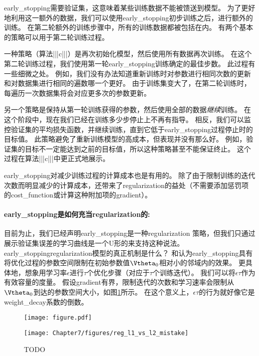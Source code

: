 \gls{early_stopping}需要验证集，这意味着某些训练数据不能被馈送到模型。
为了更好地利用这一额外的数据，我们可以使用\gls{early_stopping}初步训练之后，进行额外的训练。
在第二轮额外的训练步骤中，所有的训练数据都被包括在内。
有两个基本的策略可以用于第二轮训练过程。


一种策略（算法|||c|||）是再次初始化模型，然后使用所有数据再次训练。
在这个第二轮训练过程，我们使用第一轮\gls{early_stopping}训练确定的最佳步数。
此过程有一些细微之处。
例如，我们没有办法知道重新训练时对参数进行相同次数的更新和对数据集进行相同的遍数哪一个更好。
由于训练集变大了，在第二轮训练时，每遍历一次数据集将会对应更多次的参数更新。

另一个策略是保持从第一轮训练获得的参数，然后使用全部的数据\emph{继续}训练。
在这个阶段中，现在我们已经在训练多少步停止上不再有指导。
相反，我们可以监控验证集的平均损失函数，并继续训练，直到它低于\gls{early_stopping}过程停止时的目标值。
此策略避免了重新训练模型的高成本，但表现并没有那么好。
例如，验证集的目标不一定能达到之前的目标值，所以这种策略甚至不能保证终止。
这个过程在算法|||c|||中更正式地展示。

\gls{early_stopping}对减少训练过程的计算成本也是有用的。
除了由于限制训练的迭代次数而明显减少的计算成本，还带来了\gls{regularization}的益处（不需要添加惩罚项的\gls{cost_function}或计算这种附加项的\gls{gradient}）。


\paragraph{\gls{early_stopping}是如何充当\gls{regularization}的:}
目前为止，我们已经声明\gls{early_stopping}是一种\gls{regularization} 策略，但我们只通过展示验证集误差的学习曲线是一个U形的来支持这种说法。
\gls{early_stopping}\gls{regularization}模型的真正机制是什么？ 
\cite{Bishop1995}和\cite{Sjoberg95}认为\gls{early_stopping}具有将优化过程的参数空间限制在初始参数值$\Vtheta_0$相对小的邻域内的效果。
更具体地，想象用学习率$\epsilon$进行$\tau$个优化步骤（对应于$\tau$个训练迭代）。
我们可以将$\epsilon \tau$作为有效容量的度量。
假设\gls{gradient}有界，限制迭代的次数和学习速率会限制从$\Vtheta_0$到达的参数空间大小，如图\ref{fig:chap7_reg_l1_vs_l2_mistake}所示。
在这个意义上，$\epsilon \tau$的行为就好像它是\gls{weight_decay}系数的倒数。

\begin{figure}[!htb]
\ifOpenSource
\centerline{\texttt{[image: figure.pdf]}}
\else
\centerline{\texttt{[image: Chapter7/figures/reg\_l1\_vs\_l2\_mistake]}}
\fi
\caption{TODO}
\label{fig:chap7_reg_l1_vs_l2_mistake}
\end{figure}

